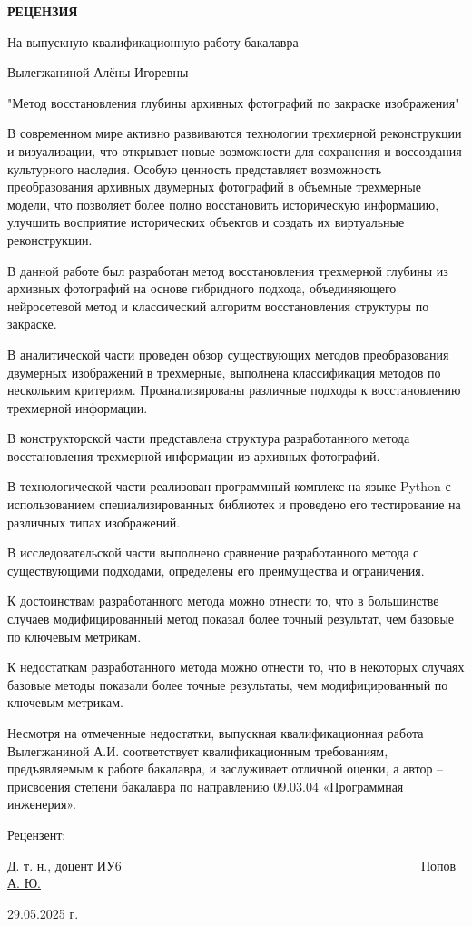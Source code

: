 \textbf{РЕЦЕНЗИЯ}\textbf{}

На выпускную квалификационную работу бакалавра

Вылегжаниной Алёны Игоревны

"Метод восстановления глубины архивных фотографий по закраске изображения"

В современном мире активно развиваются технологии трехмерной реконструкции и визуализации, что открывает новые возможности для сохранения и воссоздания культурного наследия. Особую ценность представляет возможность преобразования архивных двумерных фотографий в объемные трехмерные модели, что позволяет более полно восстановить историческую информацию, улучшить восприятие исторических объектов и создать их виртуальные реконструкции.

В данной работе был разработан метод восстановления трехмерной глубины из архивных фотографий на основе гибридного подхода, объединяющего нейросетевой метод и классический алгоритм восстановления структуры по закраске.

В аналитической части проведен обзор существующих методов преобразования двумерных изображений в трехмерные, выполнена классификация методов по нескольким критериям. Проанализированы различные подходы к восстановлению трехмерной информации.

В конструкторской части представлена структура разработанного метода восстановления трехмерной информации из архивных фотографий.

В технологической части реализован программный комплекс на языке Python с использованием специализированных библиотек и проведено его тестирование на различных типах изображений.

В исследовательской части выполнено сравнение разработанного метода с существующими подходами, определены его преимущества и ограничения.

К достоинствам разработанного метода можно отнести то, что в большинстве случаев модифицированный метод показал более точный результат, чем базовые по ключевым метрикам.

К недостаткам разработанного метода можно отнести то, что в некоторых случаях базовые методы показали более точные результаты, чем модифицированный по ключевым метрикам.

Несмотря на отмеченные недостатки, выпускная квалификационная работа Вылегжаниной А.И. соответствует квалификационным требованиям, предъявляемым к работе бакалавра, и заслуживает отличной оценки, а автор – присвоения степени бакалавра по направлению 09.03.04 «Программная инженерия».

Рецензент:

Д. т. н., доцент ИУ6 _______________________________\underline{Попов А. Ю.}

29.05.2025 г.

